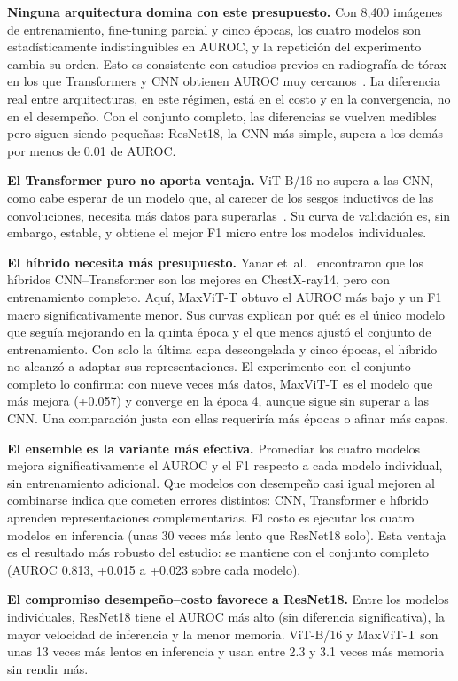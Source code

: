 \documentclass[conference]{IEEEtran}
\begin{document}
\textbf{Ninguna arquitectura domina con este presupuesto.} Con 8{,}400 imágenes de entrenamiento, fine-tuning parcial y cinco épocas, los cuatro modelos son estadísticamente indistinguibles en AUROC, y la repetición del experimento cambia su orden. Esto es consistente con estudios previos en radiografía de tórax en los que Transformers y CNN obtienen AUROC muy cercanos~\cite{murphy2022vit}. La diferencia real entre arquitecturas, en este régimen, está en el costo y en la convergencia, no en el desempeño. Con el conjunto completo, las diferencias se vuelven medibles pero siguen siendo pequeñas: ResNet18, la CNN más simple, supera a los demás por menos de 0.01 de AUROC.

\textbf{El Transformer puro no aporta ventaja.} ViT-B/16 no supera a las CNN, como cabe esperar de un modelo que, al carecer de los sesgos inductivos de las convoluciones, necesita más datos para superarlas~\cite{dosovitskiy2021vit}. Su curva de validación es, sin embargo, estable, y obtiene el mejor F1 micro entre los modelos individuales.

\textbf{El híbrido necesita más presupuesto.} Yanar et~al.~\cite{yanar2025mamba} encontraron que los híbridos CNN--Transformer son los mejores en ChestX-ray14, pero con entrenamiento completo. Aquí, MaxViT-T obtuvo el AUROC más bajo y un F1 macro significativamente menor. Sus curvas explican por qué: es el único modelo que seguía mejorando en la quinta época y el que menos ajustó el conjunto de entrenamiento. Con solo la última capa descongelada y cinco épocas, el híbrido no alcanzó a adaptar sus representaciones. El experimento con el conjunto completo lo confirma: con nueve veces más datos, MaxViT-T es el modelo que más mejora (+0.057) y converge en la época 4, aunque sigue sin superar a las CNN. Una comparación justa con ellas requeriría más épocas o afinar más capas.

\textbf{El ensemble es la variante más efectiva.} Promediar los cuatro modelos mejora significativamente el AUROC y el F1 respecto a cada modelo individual, sin entrenamiento adicional. Que modelos con desempeño casi igual mejoren al combinarse indica que cometen errores distintos: CNN, Transformer e híbrido aprenden representaciones complementarias. El costo es ejecutar los cuatro modelos en inferencia (unas 30 veces más lento que ResNet18 solo). Esta ventaja es el resultado más robusto del estudio: se mantiene con el conjunto completo (AUROC 0.813, +0.015 a +0.023 sobre cada modelo).

\textbf{El compromiso desempeño--costo favorece a ResNet18.} Entre los modelos individuales, ResNet18 tiene el AUROC más alto (sin diferencia significativa), la mayor velocidad de inferencia y la menor memoria. ViT-B/16 y MaxViT-T son unas 13 veces más lentos en inferencia y usan entre 2.3 y 3.1 veces más memoria sin rendir más.
\end{document}
